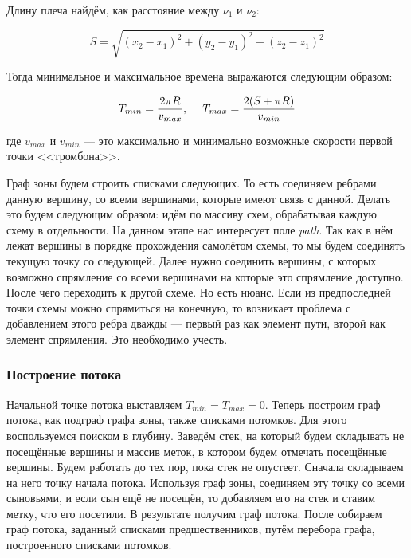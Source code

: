 \documentclass[12pt, a4 paper]{article}
\theoremstyle{plain}
\begin{document}
Длину плеча найдём, как расстояние между $\nu_1$ и $\nu_2$:

$$
S = \sqrt{(x_2 - x_1)^2 + (y_2 - y_1)^2 + (z_2 - z_1)^2}
$$

Тогда минимальное и максимальное времена выражаются следующим образом:


$$
T_{min} = \frac{2 \pi R}{v_{max}}, \hspace{3ex} T_{max} = \frac{2(S + \pi R)}{v_{min}}
$$


где $v_{max}$ и $v_{min}$ --- это максимально и минимально возможные скорости первой точки <<тромбона>>.

Граф зоны будем строить списками следующих. То есть соединяем ребрами данную вершину, со всеми вершинами, которые имеют связь с данной. Делать это будем следующим образом: идём по массиву схем, обрабатывая каждую схему в отдельности. На данном этапе нас интересует поле \textit{path}. Так как в нём лежат вершины в порядке прохождения самолётом схемы, то мы будем соединять текущую точку со следующей. Далее нужно соединить вершины, с которых возможно спрямление со всеми вершинами на которые это спрямление доступно. После чего переходить к другой схеме. Но есть нюанс. Если из предпоследней точки схемы можно спрямиться на конечную, то возникает проблема с добавлением этого ребра дважды --- первый раз как элемент пути, второй как элемент спрямления. Это необходимо учесть. 




\subsubsection{Построение потока}

Начальной точке потока выставляем $T_{min} = T_{max} = 0$. Теперь построим граф потока, как подграф графа зоны, также списками потомков. Для этого воспользуемся поиском в глубину. Заведём стек, на который будем складывать не посещённые вершины и массив меток, в котором будем отмечать посещённые вершины. Будем работать до тех пор, пока стек не опустеет. Сначала складываем на него точку начала потока. Используя граф зоны, соединяем эту точку со всеми сыновьями, и если сын ещё не посещён, то добавляем его на стек и ставим метку, что его посетили. В результате получим граф потока. После собираем граф потока, заданный списками предшественников, путём перебора графа, построенного списками потомков.
\end{document}
